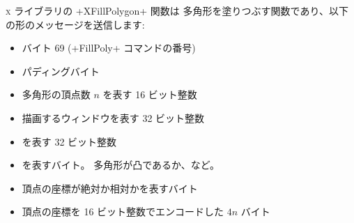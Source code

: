 \begin{example}
\textsc{x} ライブラリの \ml+XFillPolygon+ 関数は
多角形を塗りつぶす関数であり、以下の形のメッセージを送信します:
\begin{itemize}
\item バイト 69 (\ml+FillPoly+ コマンドの番号)
\item パディングバイト
\item 多角形の頂点数 $n$ を表す 16 ビット整数
\item 描画するウィンドウを表す 32 ビット整数
\item {} を表す 32 ビット整数
\item {} を表すバイト。 多角形が凸であるか、など。
\item 頂点の座標が絶対か相対かを表すバイト
\item 頂点の座標を 16 ビット整数でエンコードした $4n$ バイト
\end{itemize}
\enlargethispage{1\onelineskip} %
\end{example}

